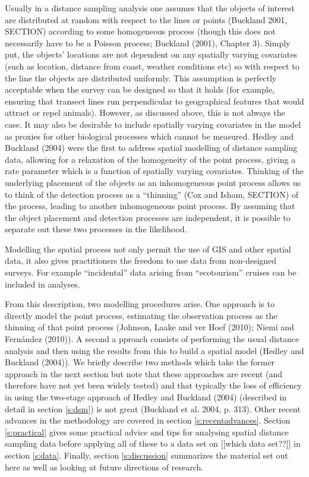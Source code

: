 \documentclass[useAMS,referee]{biom}
\begin{document}
Usually in a distance sampling analysis one assumes that the objects of interest are distributed at random with respect to the lines or points (Buckland 2001, SECTION) according to some homogeneous process (though this does not necessarily have to be a Poisson process; Buckland (2001), Chapter 3). Simply put, the objects' locations are not dependent on any spatially varying covariates (such as location, distance from coast, weather conditions etc) so with respect to the line the objects are distributed uniformly. This assumption is perfectly acceptable when the survey can be designed so that it holds (for example, ensuring that transect lines run perpendicular to geographical features that would attract or repel animals). However, as discussed above, this is not always the case. It may also be desirable to include spatially varying covariates in the model as proxies for other biological processes which cannot be measured. Hedley and Buckland (2004) were the first to address spatial modelling of distance sampling data, allowing for a relaxation of the homogeneity of the point process, giving a rate parameter which is a function of spatially varying covariates. Thinking of the underlying placement of the objects as an inhomogeneous point process allows us to think of the detection process as a ``thinning'' (Cox and Isham, SECTION) of the process, leading to another inhomogeneous point process. By assuming that the object placement and detection processes are independent, it is possible to separate out these two processes in the likelihood.

Modelling the spatial process not only permit the use of GIS and other spatial data, it also gives practitioners the freedom to use data from non-designed surveys. For example ``incidental'' data arising from ``ecotourism'' cruises can be included in analyses.

From this description, two modelling procedures arise. One approach is to directly model the point process, estimating the observation process as the thinning of that point process (Johnson, Laake and ver Hoef (2010); Niemi and Fern\'andez (2010)). A second a pproach consists of performing the usual distance analysis and then using the results from this to build a spatial model (Hedley and Buckland (2004)). We briefly describe two methods which take the former approach in the next section but note that these approaches are recent (and therefore have not yet been widely tested) and that typically the loss of efficiency in using the two-stage approach of Hedley and Buckland (2004) (described in detail in section \ref{s:dsm}) is not great (Buckland et al. 2004, p. 313). Other recent advances in the methodology are covered in section \ref{s:recentadvances}. Section \ref{s:practical} gives some practical advice and tips for analysing spatial distance sampling data before applying all of these to a data set on [[which data set??]] in section \ref{s:data}. Finally, section \ref{s:discussion} summarizes the material set out here as well as looking at future directions of research.
\end{document}
